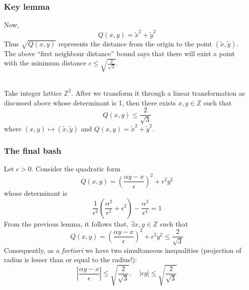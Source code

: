 \documentclass{beamer}
\begin{document}
    \begin{frame}

        \frametitle{Key lemma}

        Now, \[Q(x,y) = \tilde{x}^2 + \tilde{y}^2\] Thus \(\sqrt{Q(x,y)}\) represents the distance from the origin to the point \((\tilde{x},\tilde{y})\). The above ``first neighbour distance'' bound says that there will exist a point with the minimum distance \(c \leq \sqrt{\frac{2}{\sqrt{3}}}\). \\~\\
        
        \begin{lemma}
            Take integer lattice \(\mathbb{Z}^2\). After we transform it through a linear transformation as discussed above whose determinant is 1, then there exists \(x,y \in \mathbb{Z}\) such that \[Q(x,y) \leq \frac{2}{\sqrt{3}}\] where \((x,y) \mapsto (\tilde{x}, \tilde{y})\) and \(Q(x,y)= \tilde{x}^2 + \tilde{y}^2\).
        \end{lemma}
    \end{frame}

    \begin{frame}
        \frametitle{The final bash}

        Let \(\epsilon > 0\). Consider the quadratic form \[Q(x,y) = \left(\frac{\alpha y - x}{\epsilon}\right)^2 + \epsilon^2y^2\] whose determinant is \[\frac{1}{\epsilon^2}\left(\frac{\alpha^2}{\epsilon^2} + \epsilon^2\right) - \frac{\alpha^2}{\epsilon^4} = 1\] \pause From the previous lemma, it follows that, \(\exists x,y \in \mathbb{Z}\) such that \[Q(x,y) = \left(\frac{\alpha y - x}{\epsilon}\right)^2 + \epsilon^2y^2 \leq \frac{2}{\sqrt{3}}\] \pause Consequently, as a \emph{fortiori} we have two simultaneous inequalities (projection of radius is lesser than or equal to the radius!): \[\left|\frac{\alpha y - x}{\epsilon}\right| \leq \sqrt{\frac{2}{\sqrt{3}}}, \quad |\epsilon y| \leq \sqrt{\frac{2}{\sqrt{3}}}\]
    \end{frame}
\end{document}
